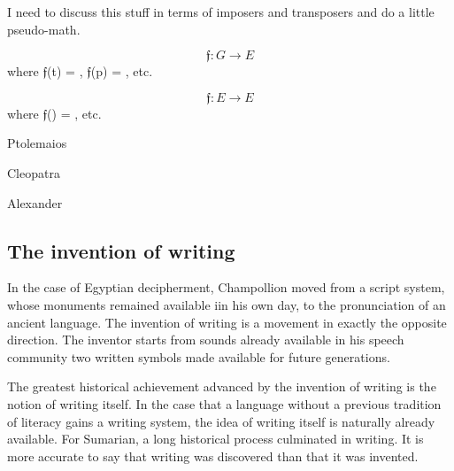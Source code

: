 I need to discuss this stuff in terms of imposers and transposers and do a little pseudo-math. 

\begin{equation}
\mathfrak{f}: G \longrightarrow E 
\end{equation}
where 
$\mathfrak{f}$(t) = {}, 
$\mathfrak{f}$(p) = {}, etc.


\begin{equation}
\mathfrak{f}: E \longrightarrow E 
\end{equation}
where 
$\mathfrak{f}$({}) = {}, etc.


Ptolemaios 

{}

Cleopatra

{}

Alexander

{}



\subsection{The invention of writing}
In the case of Egyptian decipherment, Champollion moved from a script system, whose monuments remained available iin his own day, to the pronunciation of an ancient language. The invention of writing is a movement in exactly the opposite direction. The inventor starts from sounds already available in his speech community two written symbols made available for future generations. 

The greatest historical achievement advanced by the invention of writing is the notion of writing itself. 
In the case that a language without a previous tradition of literacy gains a writing system, the idea of writing itself is naturally already available. For Sumarian, a long historical process culminated in writing. It is more accurate to say that writing was discovered than that it was invented.

